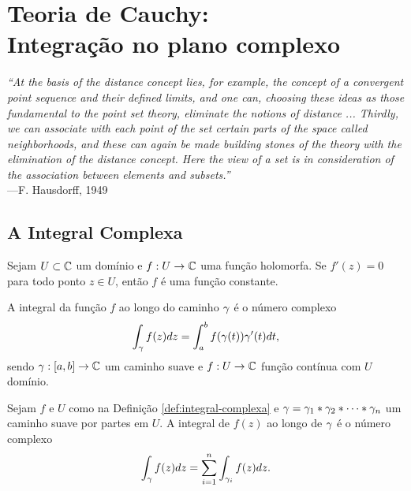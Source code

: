 \chapter[Teoria de Cauchy]{Teoria de Cauchy:\\ Integração no plano complexo}
\chaptermark{}


\hfill%
\begin{minipage}{12cm}
	\begin{flushright}
		\rightskip=0.5cm
		\textit{``At the basis of the distance concept lies, for example, 
		the concept of a convergent point sequence and their defined limits,
		and one can, choosing these ideas as those fundamental to the point 
		set theory, eliminate the notions of distance ... Thirdly, 
		we can associate with each point of the set certain parts of the space
		called neighborhoods, and these can again be made building stones of the 
		theory with the elimination of the distance concept. Here the view
		of a set is in consideration of the association between elements and
		subsets.''}
		\\[0.1cm]
		\rightskip=0.5cm
		---F. Hausdorff, 1949
	\end{flushright}
\end{minipage}



\section{A Integral Complexa}

\begin{lema}
Sejam $U \subset \mathbb{C}$ um domínio e $f:U \to \mathbb{C}$ uma função holomorfa. Se $f'(z) = 0$ para
todo ponto $z\in U$, então $f$ é uma função constante.
\end{lema}

\begin{definicao}
\label{def:integral-complexa}
A integral da função $f$ ao longo do caminho $\gamma$ é
o número complexo
\begin{equation*}
    \int_{\gamma} f(z) dz = \int_a^b f(\gamma(t))\gamma'(t) dt,
\end{equation*}
sendo $\gamma:[a,b]\to\mathbb{C}$ um caminho suave e
$f:U \to \mathbb{C}$ função contínua com $U$ domínio.
\end{definicao}

\begin{definicao}
Sejam $f$ e $U$ como na Definição \ref{def:integral-complexa} e
$\gamma = \gamma_1*\gamma_2*\cdots*\gamma_n$ um caminho suave por partes em $U$.
A integral de $f(z)$ ao longo de $\gamma$ é o número complexo
\begin{equation*}
    \int_{\gamma} f(z)dz = \sum_{i=1}^n\int_{\gamma_i} f(z)dz.
\end{equation*}
\end{definicao}



